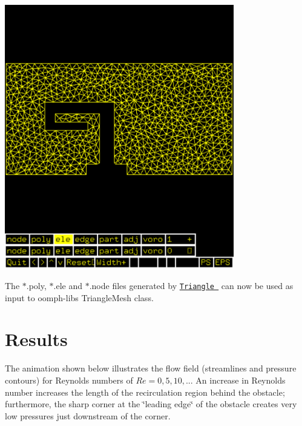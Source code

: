  
\begin{DoxyImage}
\includegraphics[width=0.75\textwidth]{showme_screenshot}
\end{DoxyImage}


The {\ttfamily  $\ast$.poly, $\ast$.ele } and {\ttfamily  $\ast$.node } files generated by \href{http://www.cs.cmu.edu/~quake/triangle.html}{\tt {\ttfamily Triangle} } can now be used as input to {\ttfamily oomph-\/lib\textquotesingle{}s} {\ttfamily Triangle\+Mesh} class.



 

\hypertarget{index_results}{}\section{Results}\label{index_results}
The animation shown below illustrates the flow field (streamlines and pressure contours) for Reynolds numbers of $ Re=0, 5, 10, ... $ An increase in Reynolds number increases the length of the recirculation region behind the obstacle; furthermore, the sharp corner at the \char`\"{}leading edge\char`\"{} of the obstacle creates very low pressures just downstream of the corner.

